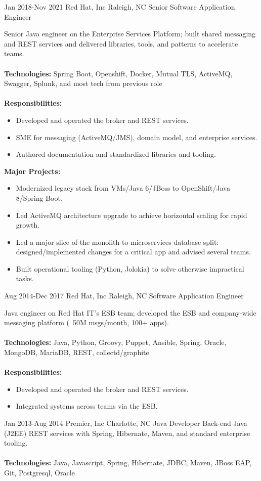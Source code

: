 \begin{entrylist}
\workentry
{Jan 2018-Nov 2021}
{Red Hat, Inc}
{Raleigh, NC}
{Senior Software Application Engineer}
{Senior Java engineer on the Enterprise Services Platform; built shared messaging and REST services and delivered libraries, tools, and patterns to accelerate teams. \\
\\
\textbf{Technologies:} Spring Boot, Openshift, Docker, Mutual TLS, ActiveMQ, Swagger, Splunk, and most tech from previous role \\
\\
\textbf{Responsibilities:}
\begin{itemize}
\item Developed and operated the broker and REST services.
\item SME for messaging (ActiveMQ/JMS), domain model, and enterprise services.
\item Authored documentation and standardized libraries and tooling.
\end{itemize}
\textbf{Major Projects:}
\begin{itemize}
\item Modernized legacy stack from VMs/Java 6/JBoss to OpenShift/Java 8/Spring Boot.
\item Led ActiveMQ architecture upgrade to achieve horizontal scaling for rapid growth.
\item Led a major slice of the monolith-to-microservices database split: designed/implemented changes for a critical app and advised several teams.
\item Built operational tooling (Python, Jolokia) to solve otherwise impractical tasks.
\end{itemize}}

\workentry
{Aug 2014-Dec 2017}
{Red Hat, Inc}
{Raleigh, NC}
{Software Application Engineer}
{Java engineer on Red Hat IT’s ESB team; developed the ESB and company-wide messaging platform (~50M msgs/month, 100+ apps). \\
\\
\textbf{Technologies:} Java, Python, Groovy, Puppet, Ansible, Spring, Oracle, MongoDB, MariaDB, REST, collectd/graphite \\
\\
\textbf{Responsibilities:}
\begin{itemize}
\item Developed and operated the broker and REST services.
\item Integrated systems across teams via the ESB.
\end{itemize}}

\workentry
{Jan 2013-Aug 2014}
{Premier, Inc}
{Charlotte, NC}
{Java Developer}
{Back-end Java (J2EE) REST services with Spring, Hibernate, Maven, and standard enterprise tooling. \\
\\
\textbf{Technologies:} Java, Javascript, Spring, Hibernate, JDBC, Maven, JBoss EAP, Git, Postgresql, Oracle}


\end{entrylist}
